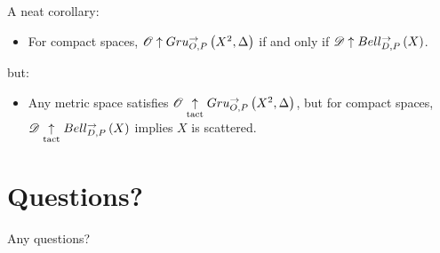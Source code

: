 \documentclass{beamer}
\theoremstyle{definition}
\begin{document}
\begin{frame}
  A neat corollary:

  \pause

  \begin{itemize}
  \item For compact spaces, \(\mathscr{O}\uparrow Gru_{O,P}^{\to}\left({X^2},{\Delta}\right)\) if and only
  if \(\mathscr{D}\uparrow Bell_{D,P}^{\to}\left({X}\right)\).
  \end{itemize}

  \pause

  but:

  \begin{itemize}
  \item Any metric space satisfies \(\mathscr{O}\underset{\text{tact}}{\uparrow}Gru_{O,P}^{\to}\left({X^2},{\Delta}\right)\),
  but for compact spaces, \(\mathscr{D}\underset{\text{tact}}{\uparrow}Bell_{D,P}^{\to}\left({X}\right)\) implies
  \(X\) is scattered.
  \end{itemize}
\end{frame}





\section{Questions?}

\begin{frame}
  Any questions?
\end{frame}


\begin{frame}[allowframebreaks]
  \tiny
  
  
\end{frame}
\end{document}
